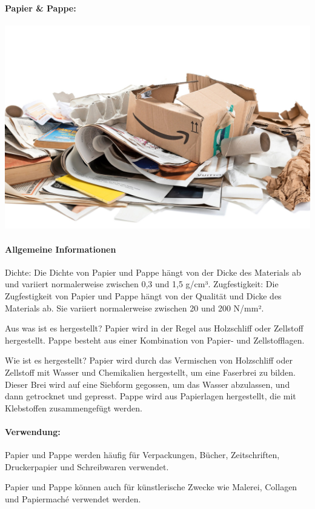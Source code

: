 \documentclass{article}
\begin{document}
\newpage
\pagestyle{fancy}
\fancyhf{}

\begin{multicols}{3}

\paragraph{Papier \& Pappe:}
\includegraphics[width=\linewidth]{papier_pappe.jpg}
\paragraph{Allgemeine Informationen}
Dichte: Die Dichte von Papier und Pappe hängt von der Dicke des Materials ab
und variiert normalerweise zwischen 0,3 und 1,5 g/cm³.
Zugfestigkeit: Die Zugfestigkeit von Papier und Pappe hängt von der Qualität
und Dicke des Materials ab. Sie variiert normalerweise zwischen 20 und 200
N/mm².

Aus was ist es hergestellt? Papier wird in der Regel aus Holzschliff oder
Zellstoff hergestellt. Pappe besteht aus einer Kombination von Papier- und
Zellstofflagen.

Wie ist es hergestellt? Papier wird durch das Vermischen von Holzschliff oder
Zellstoff mit Wasser und Chemikalien hergestellt, um eine Faserbrei zu bilden.
Dieser Brei wird auf eine Siebform gegossen, um das Wasser abzulassen, und dann
getrocknet und gepresst. Pappe wird aus Papierlagen hergestellt, die mit
Klebstoffen zusammengefügt werden.

\paragraph{Verwendung:}
\begin{compactitem}
\item Papier und Pappe werden häufig für Verpackungen, Bücher, Zeitschriften,
  Druckerpapier und Schreibwaren verwendet.
\item Papier und Pappe können auch für künstlerische Zwecke wie Malerei,
  Collagen und Papiermaché verwendet werden.
\end{compactitem}


\end{multicols}
\end{document}
